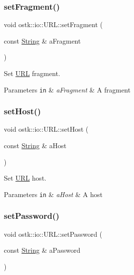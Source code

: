 \subsubsection{\texorpdfstring{set\+Fragment()}{setFragment()}}
{\footnotesize\ttfamily void ostk\+::io\+::\+U\+R\+L\+::set\+Fragment (\begin{DoxyParamCaption}\item[{const \hyperlink{namespaceostk_1_1io_a95d49b120613a7610cb1b4f03b1116b6}{String} \&}]{a\+Fragment }\end{DoxyParamCaption})}



Set \hyperlink{classostk_1_1io_1_1_u_r_l}{U\+RL} fragment. 


\begin{DoxyParams}[1]{Parameters}
\mbox{\tt in}  & {\em a\+Fragment} & A fragment \\
\hline
\end{DoxyParams}
\mbox{\label{classostk_1_1io_1_1_u_r_l_accdfb1800b5e0d89e85bc27d302004a7}} 
\subsubsection{\texorpdfstring{set\+Host()}{setHost()}}
{\footnotesize\ttfamily void ostk\+::io\+::\+U\+R\+L\+::set\+Host (\begin{DoxyParamCaption}\item[{const \hyperlink{namespaceostk_1_1io_a95d49b120613a7610cb1b4f03b1116b6}{String} \&}]{a\+Host }\end{DoxyParamCaption})}



Set \hyperlink{classostk_1_1io_1_1_u_r_l}{U\+RL} host. 


\begin{DoxyParams}[1]{Parameters}
\mbox{\tt in}  & {\em a\+Host} & A host \\
\hline
\end{DoxyParams}
\mbox{\label{classostk_1_1io_1_1_u_r_l_a2d5ddc1fc8f2693c376d6f4794b1ed26}} 
\subsubsection{\texorpdfstring{set\+Password()}{setPassword()}}
{\footnotesize\ttfamily void ostk\+::io\+::\+U\+R\+L\+::set\+Password (\begin{DoxyParamCaption}\item[{const \hyperlink{namespaceostk_1_1io_a95d49b120613a7610cb1b4f03b1116b6}{String} \&}]{a\+Password }\end{DoxyParamCaption})}



